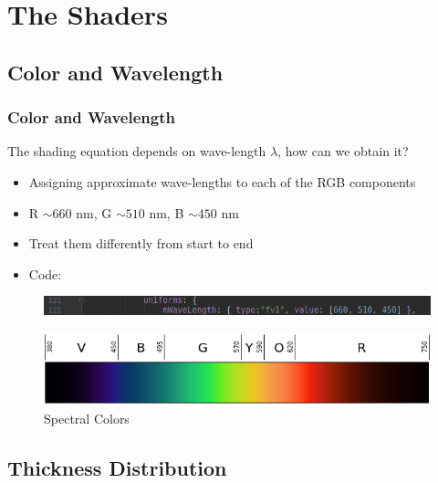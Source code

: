 \documentclass{beamer}
\begin{document}
\section{The Shaders}

\subsection{Color and Wavelength}

\begin{frame}
	\frametitle{Color and Wavelength}
	The shading equation depends on wave-length $\lambda$, how can we obtain it?
	\begin{itemize}
	\item Assigning approximate wave-lengths to each of the RGB components
	\item R $\sim 660$ nm, G $\sim 510$ nm, B $\sim 450$ nm
	\item Treat them differently from start to end
	\item Code:
	\end{itemize}
	\begin{figure}
	\centering
	\includegraphics[width=1.00\linewidth]{color_code.png}
	\end{figure}
	\begin{figure}
	\centering
	\includegraphics[width=0.7\linewidth]{color_wavelength.png}
	\caption{Spectral Colors}
	\end{figure}
\end{frame}


\subsection{Thickness Distribution}
\end{document}
